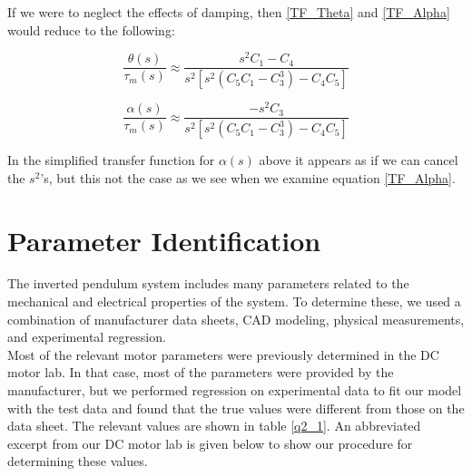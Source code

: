 \documentclass{article}
\theoremstyle{plain}
\theoremstyle{definition}
\theoremstyle{remark}
\begin{document}
If we were to neglect the effects of damping, then \eqref{TF_Theta} and \eqref{TF_Alpha} would reduce to the following:

$$ \frac{\theta(s)}{\tau_{m}(s)} \approx \frac{s^2 C_1 - C_4}{s^2 \left[s^2 \left(C_5 C_1 - C_3^3 \right) - C_4 C_5\right]} $$

$$ \frac{\alpha(s)}{\tau_{m}(s)} \approx \frac{- s^2 C_3}{s^2 \left[s^2 \left(C_5 C_1 - C_3^3 \right) - C_4 C_5\right]} $$

In the simplified transfer function for $\alpha (s)$ above it appears as if we can cancel the $s^2$'s, but this not the case as we see when we examine equation \eqref{TF_Alpha}.  

\clearpage

\section{ Parameter Identification}
The inverted pendulum system includes many parameters related to the mechanical and electrical properties of the system. To determine these, we used a combination of manufacturer data sheets, CAD modeling, physical measurements, and experimental regression.\\

Most of the relevant motor parameters were previously determined in the DC motor lab. In that case, most of the parameters were provided by the manufacturer, but we performed regression on experimental data to fit our model with the test data and found that the true values were different from those on the data sheet. The relevant values are shown in table \ref{q2_1}. An abbreviated excerpt from our DC motor lab is given below to show our procedure for determining these values. \\
\end{document}
